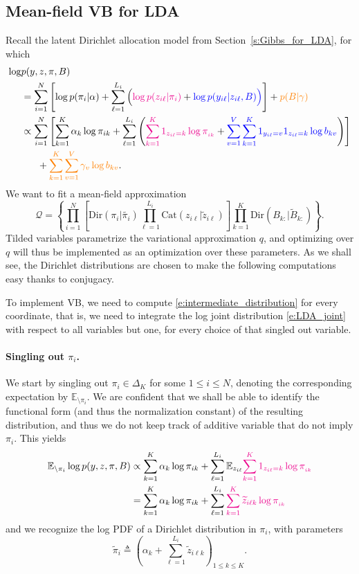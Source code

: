 \subsection{Mean-field VB for LDA}
\label{s:VB_for_LDA}
Recall the latent Dirichlet allocation model from Section~\ref{s:Gibbs_for_LDA}, for which
\begin{align}
\log &p(y, z, \pi, B)\\
&=\sum_{i=1}^N \left[\log p(\pi_i\vert \alpha) + \sum_{\ell=1}^{L_i} \Big(\textcolor{magenta}{\log p(z_{i\ell}\vert\pi_i)} + \textcolor{blue}{\log p(y_{i\ell}\vert z_{i\ell}, B)\Big)}\right] + \textcolor{orange}{p(B\vert \gamma)}\nonumber\\
&\propto \sum_{i=1}^N \left[\sum_{k=1}^K \alpha_k \log \pi_{ik} + \sum_{\ell=1}^{L_i} \left(\textcolor{magenta}{\sum_{k=1}^K 1_{z_{i\ell}=k}\log\pi_{_{ik}}} + \textcolor{blue}{\sum_{v=1}^V \sum_{k=1}^K 1_{y_{i\ell}=v}1_{z_{i\ell}=k} \log b_{kv}}\right)\right] \nonumber\\
&~~~~~+ \textcolor{orange}{\sum_{k=1}^K \sum_{v=1}^V \gamma_v\log b_{kv}}. \label{e:LDA_joint}
\end{align}
We want to fit a mean-field approximation
$$
\mathcal Q = \left\{ \prod_{i=1}^N \left[\text{Dir}(\pi_i\vert\widetilde{\pi_i}) \prod_{\ell=1}^{L_i} \text{Cat}(z_{i\ell}\vert\widetilde{z}_{i\ell}) \right] \prod_{k=1}^K \text{Dir}(B_{k:}\vert \widetilde{B}_{k:}) \right\}.
$$
Tilded variables parametrize the variational approximation $q$, and optimizing over $q$ will thus be implemented as an optimization over these parameters.
As we shall see, the Dirichlet distributions are chosen to make the following computations easy thanks to conjugacy.

To implement VB, we need to compute \eqref{e:intermediate_distribution} for every coordinate, that is, we need to integrate the log joint distribution \eqref{e:LDA_joint} with respect to all variables but one, for every choice of that singled out variable.

\paragraph{Singling out $\pi_i$.}
We start by singling out $\pi_i\in \Delta_K$ for some $1\leq i \leq N$, denoting the corresponding expectation by $\mathbb E_{\setminus \pi_i}$.
We are confident that we shall be able to identify the functional form (and thus the normalization constant) of the resulting distribution, and thus we do not keep track of additive variable that do not imply $\pi_i$.
This yields
\begin{align*}
\mathbb{E}_{\setminus \pi_i} \log p(y,z,\pi, B) &\propto \sum_{k=1}^K \alpha_k \log \pi_{ik} + \sum_{\ell=1}^{L_i} \mathbb{E}_{z_{i\ell}}\textcolor{magenta}{\sum_{k=1}^K  1_{z_{i\ell}=k}\log\pi_{_{ik}}}\\
&= \sum_{k=1}^K \alpha_k \log \pi_{ik} + \sum_{\ell=1}^{L_i} \textcolor{magenta}{\sum_{k=1}^K \widetilde{z}_{i\ell k}\log\pi_{_{ik}}}
\end{align*}
and we recognize the log PDF of a Dirichlet distribution in $\pi_i$, with parameters
$$
\widetilde\pi_i \triangleq \left( \alpha_k + \sum_{\ell=1}^{L_i} \widetilde{z}_{i\ell k}  \right)_{1\leq k\leq K}.
$$

